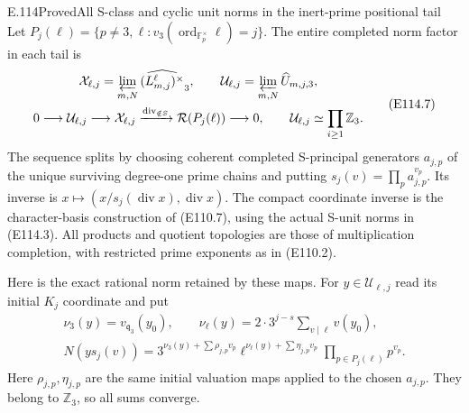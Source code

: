 \begin{statement}{E.114}{Proved}{All S-class and cyclic unit norms in the inert-prime positional tail}
Let
$P_j(\ell)=\{p\ne3,\ell:v_3(\operatorname{ord}_{\mathbb F_p^\times}\ell)=j\}$.
The entire completed norm factor in each tail is
\[
 \begin{gathered}
 \mathcal X_{\ell,j}=\varprojlim_{m,N}
                       \widehat{(L^{\ell}_{m,j})^\times}_3,
 \qquad
 \mathcal U_{\ell,j}=\varprojlim_{m,N}\widehat U_{m,j,3},\\
 0\longrightarrow\mathcal U_{\ell,j}
   \longrightarrow\mathcal X_{\ell,j}
   \xrightarrow{\operatorname{div}_{\notin S}}
          \mathcal R(P_j(\ell))\longrightarrow0,
 \qquad\mathcal U_{\ell,j}\simeq\prod_{i\ge1}\mathbb Z_3.
 \end{gathered}
 \tag{E114.7}
\]
The sequence splits by choosing coherent completed
S-principal generators $a_{j,p}$ of the unique surviving
degree-one prime chains and putting
$s_j(v)=\prod_pa_{j,p}^{v_p}$.
Its inverse is $x\mapsto(x/s_j(\operatorname{div}x),\operatorname{div}x)$.
The compact coordinate inverse is the character-basis
construction of (E110.7), using the actual S-unit norms
in (E114.3). All products and quotient topologies are
those of multiplication completion, with restricted
prime exponents as in (E110.2).

Here is the exact rational norm retained by these maps.
For $y\in\mathcal U_{\ell,j}$ read its initial $K_j$
coordinate and put
\[
 \begin{gathered}
 \nu_3(y)=v_{\mathfrak q_3}(y_0),\qquad
 \nu_\ell(y)=2\cdot3^{j-s}\sum_{v\mid\ell}v(y_0),\\
 N(y s_j(v))=
 3^{\nu_3(y)+\sum\rho_{j,p}v_p}
 \ell^{\nu_\ell(y)+\sum\eta_{j,p}v_p}
                       \prod_{p\in P_j(\ell)}p^{v_p}.
 \end{gathered}
 \tag{E114.8}
\]
Here $\rho_{j,p},\eta_{j,p}$ are the same initial
valuation maps applied to the chosen $a_{j,p}$.
They belong to $\mathbb Z_3$, so all sums converge.


\end{statement}
